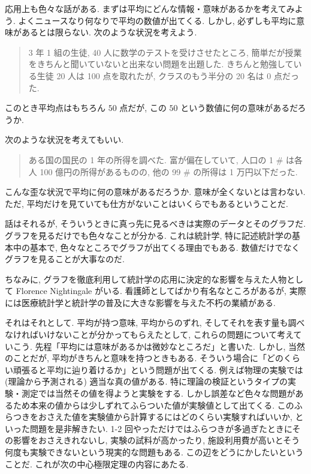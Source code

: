 \documentclass[openany, a4paper, oneside]{jsbook}
\theoremstyle{break}
\theoremstyle{breakdefn}
\begin{document}
応用上も色々な話がある.
まずは平均にどんな情報・意味があるかを考えてみよう.
よくニュースなり何なりで平均の数値が出てくる.
しかし, 必ずしも平均に意味があるとは限らない.
次のような状況を考えよう.
\begin{quote}
3 年 1 組の生徒, 40 人に数学のテストを受けさせたところ,
簡単だが授業をきちんと聞いていないと出来ない問題を出題した.
きちんと勉強している生徒 20 人は 100 点を取れたが, クラスのもう半分の 20 名は 0 点だった.
\end{quote}

このとき平均点はもちろん $50$ 点だが, この $50$ という数値に何の意味があるだろうか.

次のような状況を考えてもいい.
\begin{quote}
ある国の国民の 1 年の所得を調べた.
富が偏在していて, 人口の 1 \#  は各人 100 億円の所得があるものの,
他の 99 \#  の所得は 1 万円以下だった.
\end{quote}

こんな歪な状況で平均に何の意味があるだろうか.
意味が全くないとは言わない.
ただ, 平均だけを見ていても仕方がないことはいくらでもあるということだ.

話はそれるが, そういうときに真っ先に見るべきは実際のデータとそのグラフだ.
グラフを見るだけでも色々なことが分かる.
これは統計学, 特に記述統計学の基本中の基本で, 色々なところでグラフが出てくる理由でもある.
数値だけでなくグラフを見ることが大事なのだ.

ちなみに, グラフを徹底利用して統計学の応用に決定的な影響を与えた人物として Florence Nightingale がいる.
看護師としてばかり有名なところがあるが, 実際には医療統計学と統計学の普及に大きな影響を与えた不朽の業績がある.

それはそれとして.
平均が持つ意味, 平均からのずれ, そしてそれを表す量も調べなければいけないことが分かってもらえたとして,
これらの問題について考えていこう.
先程「平均には意味があるかは微妙なところだ」と書いた.
しかし, 当然のことだが, 平均がきちんと意味を持つときもある.
そういう場合に「どのくらい頑張ると平均に辿り着けるか」という問題が出てくる.
例えば物理の実験では (理論から予測される) 適当な真の値がある.
特に理論の検証というタイプの実験・測定では当然その値を得ようと実験をする.
しかし誤差など色々な問題があるため本来の値からは少しずれてふらついた値が実験値として出てくる.
このふらつきをおさえた値を実験値から計算するにはどのくらい実験すればいいか, といった問題を是非解きたい.
1-2 回やっただけではふらつきが多過ぎたときにその影響をおさえきれないし,
実験の試料が高かったり, 施設利用費が高いとそう何度も実験できないという現実的な問題もある.
この辺をどうにかしたいということだ.
これが次の中心極限定理の内容にあたる.
\end{document}
